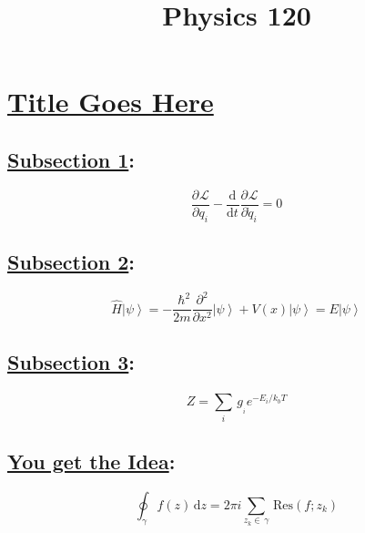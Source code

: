 \documentclass[fleqn]{article}
\title{\vspace{1mm}Physics 120}
\date{}
\begin{document}
\newcommand{\myint}[4]{\int_{#1}^{#2} \!  #3  \, \mathrm{d} #4}
\newcommand{\paren}[1]{\!\left({#1}\right)}
\newcommand{\commutator}[2]{\left[ #1\, , #2\right]}
\newcommand{\expec}[1]{\! \left\langle {#1}\right\rangle}
\newcommand{\expect}[1]{\! \langle {#1}\rangle}
\newcommand{\mysum}[3]{\sum_{#1}^{#2} \, #3 }
\newcommand{\pdiv}[3]{ \frac{\partial^{#3}{#1}}{\partial{#2}^{#3} } }
\newcommand{\deriv}[3]{ \frac{\mathrm{d}^{#3}{#1}}{\mathrm{d}{#2}^{#3} } }
\newcommand{\braket}[1]{\!\left| #1 \right\rangle}
\newcommand{\half}[0]{\frac{1}{2}}


\section*{\centering \underline{Title Goes Here}}
\begin{multicols*}{3} %
\subsection*{ \centering \underline{Subsection 1}:}
\[\pdiv{\mathcal{L}}{q_{i}}{} - \deriv{}{t}{}\pdiv{\mathcal{L}}{\dot{q}_{i}}{}=0\]
\subsection*{ \centering \underline{Subsection 2}:}
\[\hat{H}\braket{\psi} = -\frac{\,\,\hbar^2}{2m}\pdiv{}{x}{2}\braket{\psi} + V\paren{x}\braket{\psi} = E\braket{\psi}\]
\subsection*{ \centering \underline{Subsection 3}:}
\[Z = \mysum{i}{}{g_{_i}e^{-E_{i}/k_{b}T}}\]
\subsection*{ \centering \underline{You get the Idea}:}
\[\oint_{\gamma} \!f(z)\, \mathrm{d}z = 2\pi i \!\mysum{z_k \in \,\gamma}{}{\!\!\mbox{Res}\paren{f;z_k}}\]
















\end{multicols*}
\end{document}
